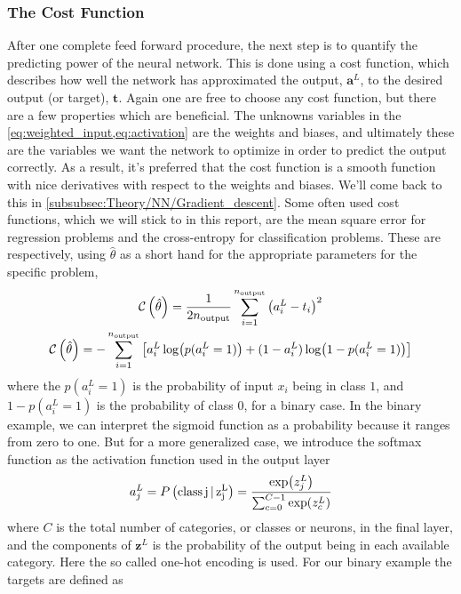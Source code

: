 \documentclass[10pt, twocolumn]{article}
\begin{document}
\subsubsection{The Cost Function}
\label{subsubsec:Theory/NN/Cost_func}
After one complete feed forward procedure, the next step is to quantify the predicting power of the neural network. This is done using a cost function, which describes how well the network has approximated the output, $\bm{a}^L$, to the desired output (or target), $\bm{t}$. Again one are free to choose any cost function, but there are a few properties which are beneficial. The unknowns variables in the \cref{eq:weighted_input,eq:activation} are the weights and biases, and ultimately these are the variables we want the network to optimize in order to predict the output correctly. As a result, it's preferred that the cost function is a smooth function with nice derivatives with respect to the weights and biases. We'll come back to this in \cref{subsubsec:Theory/NN/Gradient_descent}. Some often used cost functions, which we will stick to in this report, are the mean square error for regression problems and the cross-entropy for classification problems. These are respectively, using $\hat{\theta}$ as a short hand for the appropriate parameters for the specific problem,
\begin{gather}
    \mathcal{C}\left(\hat{\theta}\right) = \frac{1}{2n_{\rm{output}}}\sum_{i=1}^{n_{\rm{output}}} \left(a^L_i-t_i\right)^2 
    \label{eq:MSE_costfunc}
    \\
    \mathcal{C}\left(\hat{\theta}\right) = - \sum_{i=1}^{n_{\rm{output}}} \left[a^L_i\log(p(a^L_i=1)) + (1-a^L_i)\log(1-p(a^L_i=1)) \right]
    \label{eq:cross_entropy}
\end{gather}
where the $p(a^L_i=1)$ is the probability of input $x_i$ being in class $1$, and $1-p(a^L_i=1)$ is the probability of class $0$, for a binary case. In the binary example, we can interpret the sigmoid function as a probability because it ranges from zero to one. But for a more generalized case, we introduce the softmax function as the activation function used in the output layer
\begin{equation}
    a_j^L = P\left(\rm{class}\, j \,|\, z_j^L\right) = \frac{\exp(z_j^L)}{\sum_{c=0}^{C-1} \exp(z_c^L)}
    \label{eq:softmax_output}
\end{equation}
where $C$ is the total number of categories, or classes or neurons, in the final layer, and the components of $\bm{z}^L$ is the probability of the output being in each available category. Here the so called one-hot encoding is used. For our binary example the targets are defined as
\end{document}
